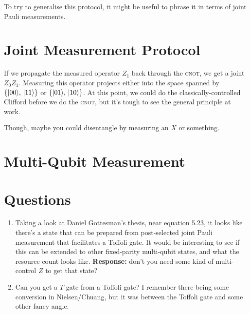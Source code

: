 \documentclass[10pt,a4paper, english]{scrartcl}
\providecommand{\cnot}{\textsc{cnot}}
\begin{document}
To try to generalise this protocol, it might be useful to phrase it in terms of joint Pauli measurements.
\section{Joint Measurement Protocol}
If we propagate the measured operator $Z_1$ back through the \cnot, we get a joint $Z_0Z_1$. 
Measuring this operator projects either into the space spanned by $\left \lbrace {\left\vert{00}\right\rangle},\, {\left\vert{11}\right\rangle} \right \rbrace$ or $\left \lbrace {\left\vert{01}\right\rangle},\, {\left\vert{10}\right\rangle} \right \rbrace$. 
At this point, we could do the classically-controlled Clifford before we do the \cnot, but it's tough to see the general principle at work. 

Though, maybe you could disentangle by measuring an $X$ or something.
\section{Multi-Qubit Measurement}
\section{Questions}
\begin{enumerate}
\item Taking a look at Daniel Gottesman's thesis, near equation 5.23, it looks like there's a state that can be prepared from post-selected joint Pauli measurement that facilitates a Toffoli gate. It would be interesting to see if this can be extended to other fixed-parity multi-qubit states, and what the resource count looks like. \textbf{Response:} don't you need some kind of multi-control $Z$ to get that state?
\item Can you get a $T$ gate from a Toffoli gate? I remember there being some conversion in Nielsen/Chuang, but it was between the Toffoli gate and some other fancy angle. 
\end{enumerate}
\end{document}

